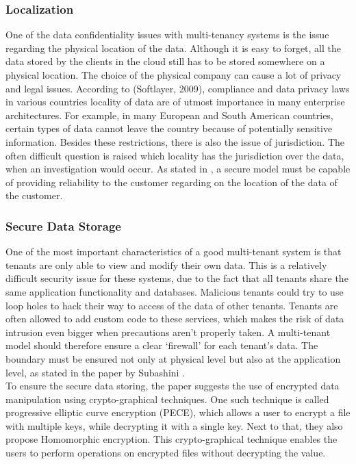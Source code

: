 \subsubsection{Localization}
One of the data confidentiality issues with multi-tenancy systems is the issue regarding the physical location of the data. Although it is easy to forget, all the data stored by the clients in the cloud still has to be stored somewhere on a physical location. The choice of the physical company can cause a lot of privacy and legal issues. According to (Softlayer, 2009), compliance and data privacy laws in various countries locality of data are of utmost importance in many enterprise architectures. For example, in many European and South American countries, certain types of data cannot leave the country because of potentially sensitive information. Besides these restrictions, there is also the issue of jurisdiction. The often difficult question is raised which locality has the jurisdiction over the data, when an investigation would occur. As stated in \cite{Subashini2010Security}, a secure model must be capable of providing reliability to the customer regarding on the location of the data of the customer.

\subsubsection{Secure Data Storage}
One of the most important characteristics of a good multi-tenant system is that tenants are only able to view and modify their own data. This is a relatively difficult security issue for these systems, due to the fact that all tenants share the same application functionality and databases. Malicious tenants could try to use loop holes to hack their way to access of the data of other tenants. Tenants are often allowed to add custom code to these services, which makes the risk of data intrusion even bigger when precautions aren’t properly taken. A multi-tenant model should therefore ensure a clear ‘firewall’ for each tenant’s data. The boundary must be ensured not only at physical level but also at the application level, as stated in the paper by Subashini \cite{Subashini2010Security}. \\
To ensure the secure data storing, the paper \cite{Takahashi2012Security} suggests the use of encrypted data manipulation using crypto-graphical techniques. One such technique is called progressive elliptic curve encryption (PECE), which allows a user to encrypt a file with multiple keys, while decrypting it with a single key. Next to that, they also propose Homomorphic encryption. This crypto-graphical technique enables the users to perform operations on encrypted files without decrypting the value.

